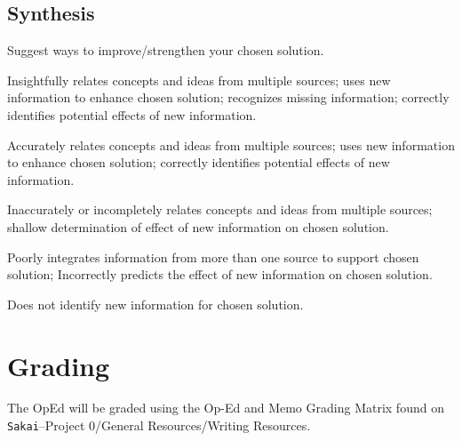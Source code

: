 \documentclass{tufte-handout}\usepackage[]{graphicx}\usepackage[]{color}
\newenvironment{enumerate*}%
  {\begin{enumerate}%
    \setlength{\itemsep}{0pt}%
    \setlength{\parskip}{0pt}}%
  {\end{enumerate}}
\begin{document}
\subsection{Synthesis}

Suggest ways to improve/strengthen your chosen solution.

\begin{enumerate*}
	\item Insightfully relates concepts and ideas from multiple sources; uses new information to enhance chosen solution; recognizes missing information; correctly identifies potential effects of new information.	
	\item Accurately relates concepts and ideas from multiple sources; uses new information to enhance chosen solution; correctly identifies potential effects of new information.	
	\item Inaccurately or incompletely relates concepts and ideas from multiple sources; shallow determination of effect of new information on chosen solution.	
	\item Poorly integrates information from more than one source to support chosen solution; Incorrectly predicts the effect of new information on chosen solution.	
	\item Does not identify new information for chosen solution.	
\end{enumerate*}

\section{Grading}

The OpEd will be graded using the Op-Ed and Memo Grading Matrix found on \texttt{Sakai}--Project 0/General Resources/Writing Resources.
\end{document}
